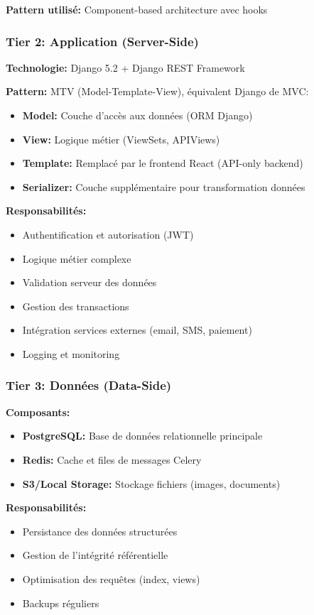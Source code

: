 \textbf{Pattern utilisé:} Component-based architecture avec hooks

\subsubsection{Tier 2: Application (Server-Side)}

\textbf{Technologie:} Django 5.2 + Django REST Framework

\textbf{Pattern:} MTV (Model-Template-View), équivalent Django de MVC:
\begin{itemize}
    \item \textbf{Model:} Couche d'accès aux données (ORM Django)
    \item \textbf{View:} Logique métier (ViewSets, APIViews)
    \item \textbf{Template:} Remplacé par le frontend React (API-only backend)
    \item \textbf{Serializer:} Couche supplémentaire pour transformation données
\end{itemize}

\textbf{Responsabilités:}
\begin{itemize}
    \item Authentification et autorisation (JWT)
    \item Logique métier complexe
    \item Validation serveur des données
    \item Gestion des transactions
    \item Intégration services externes (email, SMS, paiement)
    \item Logging et monitoring
\end{itemize}

\subsubsection{Tier 3: Données (Data-Side)}

\textbf{Composants:}
\begin{itemize}
    \item \textbf{PostgreSQL:} Base de données relationnelle principale
    \item \textbf{Redis:} Cache et files de messages Celery
    \item \textbf{S3/Local Storage:} Stockage fichiers (images, documents)
\end{itemize}

\textbf{Responsabilités:}
\begin{itemize}
    \item Persistance des données structurées
    \item Gestion de l'intégrité référentielle
    \item Optimisation des requêtes (index, views)
    \item Backups réguliers
\end{itemize}

